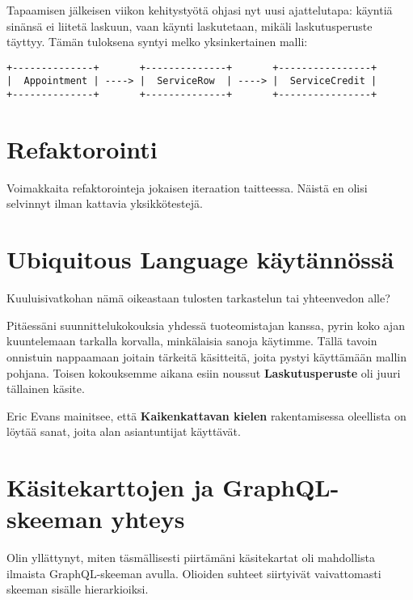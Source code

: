 Tapaamisen jälkeisen viikon kehitystyötä ohjasi nyt uusi ajattelutapa:
käyntiä sinänsä ei liitetä laskuun, vaan käynti laskutetaan, mikäli
laskutusperuste täyttyy. Tämän tuloksena syntyi melko yksinkertainen
malli:

\begin{verbatim}
+--------------+       +--------------+       +----------------+
|  Appointment | ----> |  ServiceRow  | ----> |  ServiceCredit |
+--------------+       +--------------+       +----------------+
\end{verbatim}

\hypertarget{refaktorointi}{%
\section{Refaktorointi}\label{refaktorointi}}

Voimakkaita refaktorointeja jokaisen iteraation taitteessa. Näistä en
olisi selvinnyt ilman kattavia yksikkötestejä.

\hypertarget{ubiquitous-language-kuxe4ytuxe4nnuxf6ssuxe4}{%
\section{Ubiquitous Language
käytännössä}\label{ubiquitous-language-kuxe4ytuxe4nnuxf6ssuxe4}}

Kuuluisivatkohan nämä oikeastaan tulosten tarkastelun tai yhteenvedon
alle?

Pitäessäni suunnittelukokouksia yhdessä tuoteomistajan kanssa, pyrin
koko ajan kuuntelemaan tarkalla korvalla, minkälaisia sanoja käytimme.
Tällä tavoin onnistuin nappaamaan joitain tärkeitä käsitteitä, joita
pystyi käyttämään mallin pohjana. Toisen kokouksemme aikana esiin
noussut \textbf{Laskutusperuste} oli juuri tällainen käsite.

Eric Evans mainitsee, että \textbf{Kaikenkattavan kielen} rakentamisessa
oleellista on löytää sanat, joita alan asiantuntijat käyttävät.

\hypertarget{kuxe4sitekarttojen-ja-graphql-skeeman-yhteys}{%
\section{Käsitekarttojen ja GraphQL-skeeman
yhteys}\label{kuxe4sitekarttojen-ja-graphql-skeeman-yhteys}}

Olin yllättynyt, miten täsmällisesti piirtämäni käsitekartat oli
mahdollista ilmaista GraphQL-skeeman avulla. Olioiden suhteet siirtyivät
vaivattomasti skeeman sisälle hierarkioiksi.
